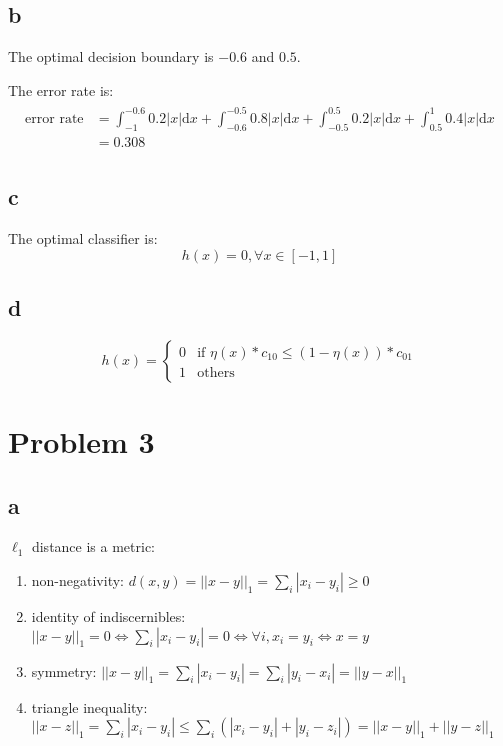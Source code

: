 \documentclass[a4paper,11pt]{article}
\theoremstyle{mytheor}
\begin{document}
\subsection*{b}
The optimal decision boundary is $-0.6$ and $0.5$.

The error rate is:
\begin{align}
	\begin{split}
		\text{error rate} &=  \int_{-1}^{-0.6} 0.2 |x|  \text{d}x + \int_{-0.6}^{-0.5} 0.8 |x|  \text{d}x	
			+ \int_{-0.5}^{0.5} 0.2 |x|  \text{d}x + \int_{0.5}^{1} 0.4 |x|  \text{d}x \\
			& = 0.308		
	\end{split}
\end{align}

\subsection*{c}
The optimal classifier is:
\begin{equation}
	h(x) = 0, \forall x \in [-1, 1]
\end{equation}

\subsection*{d}

\begin{equation}
h(x) = \left\{ \begin{array}{ll}
0 & \mbox{if $\eta(x) * c_{10} \leq (1-\eta(x)) * c_{01} $}\\
1 & \mbox{others} \end{array} 
\right.
\end{equation}

\section*{Problem 3}
\subsection*{a}
$\ell_1$ distance is a metric:
\begin{enumerate}
	\item non-negativity: $d(x,y) = ||x-y||_1 = \sum\limits_{i} |x_i - y_i| \geq 0$
	\item identity of indiscernibles: $||x-y||_1 = 0   \Leftrightarrow \sum\limits_{i} |x_i - y_i| = 0 \Leftrightarrow \forall i, x_i = y_i 
	\Leftrightarrow x = y$ 
	\item symmetry: $||x-y||_1 = \sum\limits_{i}|x_i - y_i| = \sum\limits_{i}|y_i - x_i| = ||y-x||_1$
	\item triangle inequality: $||x-z||_1 = \sum\limits_{i}|x_i - y_i| \leq \sum\limits_{i}(|x_i-y_i| + |y_i-z_i|) = ||x - y||_1 + ||y-z||_1 $
\end{enumerate}
\end{document}

